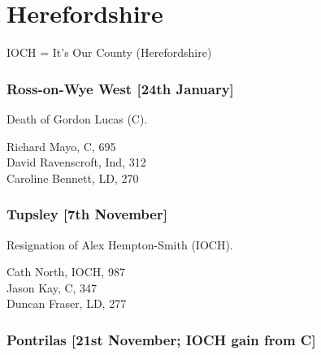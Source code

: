 \documentclass[a4paper,openany,10pt]{book}
\begin{document}
\vfill

\section[Herefordshire]{{Herefordshire}}

IOCH = It's Our County (Herefordshire)

\subsubsection*{Ross-on-Wye West \hspace*{\fill}\nolinebreak[1]%
\enspace\hspace*{\fill}
[24th January]}


Death of Gordon Lucas (C).



Richard Mayo, C, 695\\
David Ravenscroft, Ind, 312\\
Caroline Bennett, LD, 270\\


\subsubsection*{Tupsley \hspace*{\fill}\nolinebreak[1]%
\enspace\hspace*{\fill}
[7th November]}


Resignation of Alex Hempton-Smith (IOCH).



Cath North, IOCH, 987\\
Jason Kay, C, 347\\
Duncan Fraser, LD, 277\\


\subsubsection*{Pontrilas \hspace*{\fill}\nolinebreak[1]%
\enspace\hspace*{\fill}
[21st November; IOCH gain from C]}

\end{document}

